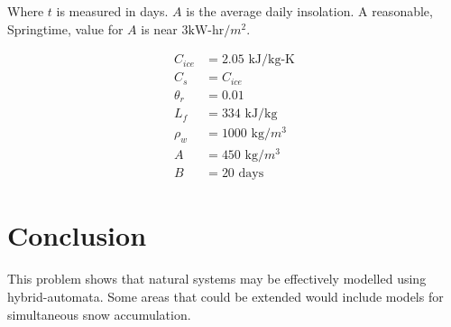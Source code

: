 \documentclass{article}
\begin{document}
Where $t$ is measured in days.
$A$ is the average daily insolation.
A reasonable, Springtime, value for $A$ is near $3 \text{kW-hr}/m^2$.

\begin{align}
 C_{ice} &= 2.05 \text{ kJ/kg-K} \\
 C_s &= C_{ice} \\
\theta_r &= 0.01 \\
L_f &= 334 \text{ kJ/kg} \\
\rho_w &= 1000 \text{ kg/$m^3$} \\
A &= 450 \text{ kg/$m^3$} \\
B &= 20 \text{ days}
\end{align}


 \section{Conclusion}

 This problem shows that natural systems may be effectively
 modelled using hybrid-automata.
 Some areas that could be extended would include models
 for simultaneous snow accumulation.




\end{document}
